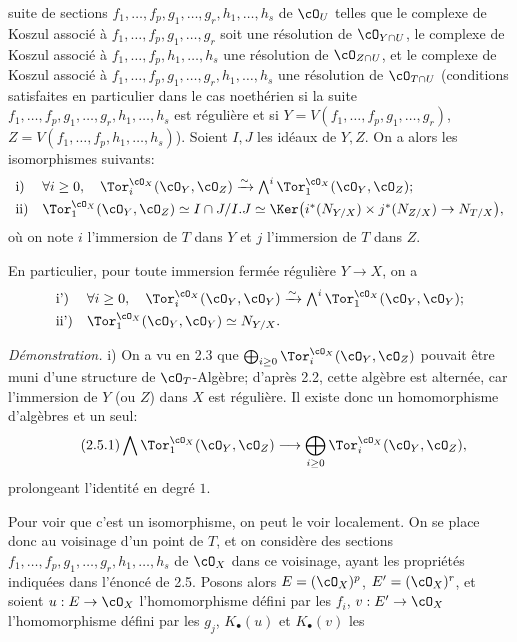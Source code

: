 suite de sections \(f_1,\ldots,f_p,g_1,\ldots,g_r,h_1,\ldots,h_s\) de \(\cO_U\) telles que le complexe de Koszul associé à \(f_1,\ldots,f_p,g_1,\ldots,g_r\) soit une résolution de \(\cO_{Y\cap U}\), le complexe de Koszul associé à \(f_1,\ldots,f_p,h_1,\ldots,h_s\) une résolution de \(\cO_{Z\cap U}\), et le complexe de Koszul associé à \(f_1,\ldots,f_p,g_1,\ldots,g_r,h_1,\ldots,h_s\) une résolution de \(\cO_{T\cap U}\) (conditions satisfaites en particulier dans le cas noethérien si la suite \(f_1,\ldots,f_p,g_1,\ldots,g_r,h_1,\ldots,h_s\) est régulière et si \(Y=V(f_1,\ldots,f_p,g_1,\ldots,g_r)\), \(Z=V(f_1,\ldots,f_p,h_1,\ldots,h_s)\)). Soient \(I,J\) les idéaux de \(Y,Z\). On a alors les isomorphismes suivants:
\[
\begin{array}{ll}
\text{i)}& \forall i\ge0,\quad
\Tor_i^{\cO_X}(\cO_Y,\cO_Z)\xrightarrow{\sim}
\bigwedge^i\Tor_1^{\cO_X}(\cO_Y,\cO_Z);\\[0.8ex]
\text{ii)}&
\Tor_1^{\cO_X}(\cO_Y,\cO_Z)\simeq
I\cap J/I.J\simeq
\Ker\bigl(i^*(N_{Y/X})\times j^*(N_{Z/X})\to N_{T/X}\bigr),
\end{array}
\]
où on note \(i\) l'immersion de \(T\) dans \(Y\) et \(j\) l'immersion de \(T\) dans \(Z\).

En particulier, pour toute immersion fermée régulière \(Y\to X\), on a
\[
\begin{array}{ll}
\text{i')}& \forall i\ge0,\quad
\Tor_i^{\cO_X}(\cO_Y,\cO_Y)\xrightarrow{\sim}
\bigwedge^i\Tor_1^{\cO_X}(\cO_Y,\cO_Y);\\[0.8ex]
\text{ii')}&
\Tor_1^{\cO_X}(\cO_Y,\cO_Y)\simeq N_{Y/X}.
\end{array}
\]

\emph{Démonstration.} i) On a vu en 2.3 que \(\bigoplus_{i\ge0}\Tor_i^{\cO_X}(\cO_Y,\cO_Z)\) pouvait être muni d'une structure de \(\cO_T\)-Algèbre; d'après 2.2, cette algèbre est alternée, car l'immersion de \(Y\) (ou \(Z\)) dans \(X\) est régulière. Il existe donc un homomorphisme d'algèbres et un seul:
\begin{equation}\tag{2.5.1}
\bigwedge \Tor_1^{\cO_X}(\cO_Y,\cO_Z)\longrightarrow
\bigoplus_{i\ge0}\Tor_i^{\cO_X}(\cO_Y,\cO_Z),
\end{equation}
prolongeant l'identité en degré \(1\).

Pour voir que c'est un isomorphisme, on peut le voir localement. On se place donc au voisinage d'un point de \(T\), et on considère des sections \(f_1,\ldots,f_p,g_1,\ldots,g_r,h_1,\ldots,h_s\) de \(\cO_X\) dans ce voisinage, ayant les propriétés indiquées dans l'énoncé de 2.5. Posons alors \(E=(\cO_X)^p\), \(E'=(\cO_X)^r\), et soient \(u:E\to\cO_X\) l'homomorphisme défini par les \(f_i\), \(v:E'\to\cO_X\) l'homomorphisme défini par les \(g_j\), \(K_\bullet(u)\) et \(K_\bullet(v)\) les
